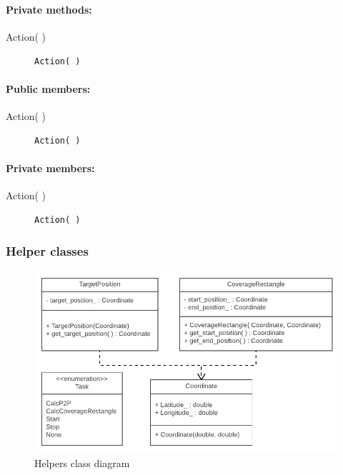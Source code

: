 \paragraph{Private methods:}
\begin{adjustwidth}{2.5em}{0pt}\begin{description}
		\item [Action( )] \texttt{Action( )}
\end{description}\end{adjustwidth}

\paragraph{Public members:}
\begin{adjustwidth}{2.5em}{0pt}\begin{description}
		\item [Action( )] \texttt{Action( )} 
\end{description}\end{adjustwidth}

\paragraph{Private members:}
\begin{adjustwidth}{2.5em}{0pt}\begin{description}
		\item [Action( )] \texttt{Action( )}
\end{description}\end{adjustwidth}

\subsubsection{Helper classes}

\begin{figure}[H]
\centering
\includegraphics[width=1\linewidth]{Images/Design/Helpers_class_diagram}
\caption{Helpers class diagram}
\label{fig:helpers}
\end{figure}

